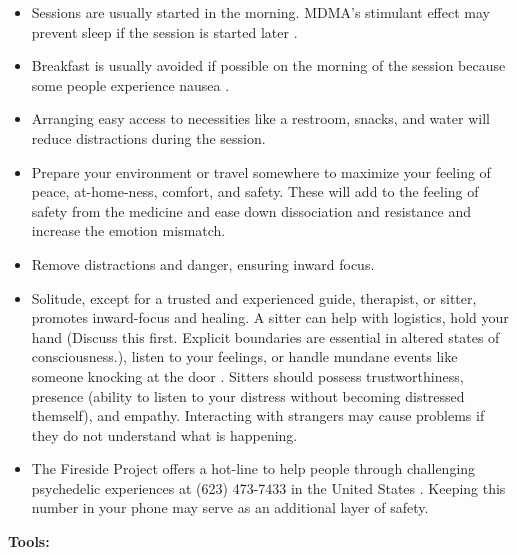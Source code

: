 \documentclass[12pt,letterpaper]{article}
\begin{document}
\begin{itemize}
    \item Sessions are usually started in the morning. MDMA's stimulant effect may prevent sleep if the session is started later \cite{berro2018acute}.
    \item Breakfast is usually avoided if possible on the morning of the session because some people experience nausea \cite{mithoeferManual}.
    \item Arranging easy access to necessities like a restroom, snacks, and water will reduce distractions during the session.
    \item Prepare your environment or travel somewhere to maximize your feeling of peace, at-home-ness, comfort, and safety. These will add to the feeling of safety from the medicine and ease down dissociation and resistance and increase the emotion mismatch. 
    \item Remove distractions and danger, ensuring inward focus. 
    \item Solitude, except for a trusted and experienced guide, therapist, or sitter, promotes inward-focus and healing. A sitter can help with logistics, hold your hand (Discuss this first. Explicit boundaries are essential in altered states of consciousness.), listen to your feelings, or handle mundane events like someone knocking at the door \cite{mithoeferManual,thalSitter}. Sitters should possess trustworthiness, presence (ability to listen to your distress without becoming distressed themself), and empathy. Interacting with strangers may cause problems if they do not understand what is happening.
    \item The Fireside Project offers a hot-line to help people through challenging psychedelic experiences at (623) 473-7433 in the United States \cite{firesideProject}. Keeping this number in your phone may serve as an additional layer of safety.
\end{itemize}
\noindent \textbf{Tools:}
\end{document}
